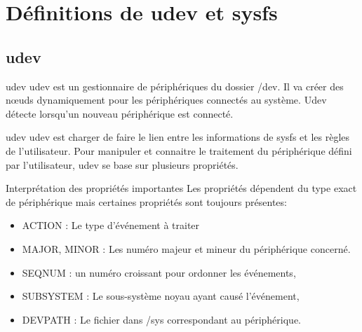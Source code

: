 \documentclass{beamer}
\begin{document}
\section{Définitions de udev et sysfs}

\subsection{udev}

\begin{frame}
\begin{block}{udev} 
	udev est un gestionnaire de périphériques du dossier /dev. Il va créer des nœuds dynamiquement pour les périphériques connectés au système. 
	Udev détecte lorsqu'un nouveau périphérique est connecté. 
\end{block}
\end{frame}

\begin{frame}
\begin{block}{udev}
	udev est charger de faire le lien entre les informations de sysfs et les règles de l'utilisateur.
	Pour manipuler et connaitre le traitement du périphérique défini par l'utilisateur, udev se base sur plusieurs propriétés.
	 
\end{block}
\end{frame}

\begin{frame}
\begin{exampleblock}{Interprétation des propriétés importantes} 
Les propriétés dépendent du type exact de périphérique mais certaines propriétés sont toujours présentes:
\begin{itemize}
	[circle]
	\item ACTION : Le type d’événement à traiter
	\item MAJOR, MINOR : Les numéro majeur et mineur du périphérique concerné. 
    \item SEQNUM : un numéro croissant pour ordonner les événements, 
    \item SUBSYSTEM : Le sous-système noyau ayant causé l’événement, 
	\item DEVPATH : Le fichier dans /sys correspondant au périphérique. 
\end{itemize}
\end{exampleblock}
\end{frame}
\end{document}
